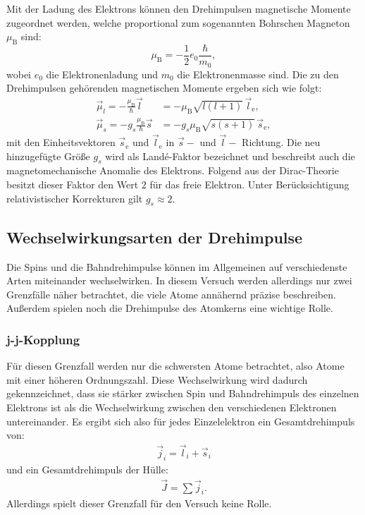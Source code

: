 \documentclass{article}
\begin{document}
	Mit der Ladung des Elektrons können den Drehimpulsen magnetische Momente zugeordnet werden, welche proportional zum sogenannten Bohrschen Magneton $\mu_\text{B}$ sind:
	\begin{equation}
	\mu_{\text{B}} = -\frac{1}{2} e_0 \frac{\hbar}{m_0},
	\end{equation}
	wobei $e_0$ die Elektronenladung und $m_0$ die Elektronenmasse sind. Die zu den Drehimpulsen gehörenden magnetischen Momente ergeben sich wie folgt:
	\begin{align}
	\vec{\mu}_l=-\frac{\mu_\text{B}}{\hbar}\vec{l}&=-\mu_\text{B}\sqrt{l(l+1)}\,\vec{l}_\text{e},\\
	\vec{\mu}_s=-g_s\frac{\mu_\text{B}}{\hbar}\vec{s}&=-g_s\mu_\text{B}\sqrt{s(s+1)}\,\vec{s}_\text{e},
	\end{align}
	mit den Einheitsvektoren $\vec{s}_\text{e}$ und $\vec{l}_\text{e}$ in $\vec{s}-$ und $\vec{l}-$ Richtung. Die neu hinzugefügte Größe $g_s$ wird als Landé-Faktor bezeichnet und beschreibt auch die magnetomechanische Anomalie des Elektrons. Folgend aus der Dirac-Theorie besitzt dieser Faktor den Wert $2$ für das freie Elektron. Unter Berücksichtigung relativistischer Korrekturen gilt $g_s \approx 2$.
	
	\subsection{Wechselwirkungsarten der Drehimpulse}
	\label{sec:Wechselwirkungen}
	Die Spins und die Bahndrehimpulse können im Allgemeinen auf verschiedenste Arten miteinander wechselwirken. In diesem Versuch werden allerdings nur zwei Grenzfälle näher betrachtet, die viele Atome annähernd präzise beschreiben. Außerdem spielen noch die Drehimpulse des Atomkerns eine wichtige Rolle.
	
	\subsubsection{j-j-Kopplung}
	Für diesen Grenzfall werden nur die schwersten Atome betrachtet, also Atome mit einer höheren Ordnungszahl. Diese Wechselwirkung wird dadurch gekennzeichnet, dass sie stärker zwischen Spin und Bahndrehimpuls des einzelnen Elektrons ist als die Wechselwirkung zwischen den verschiedenen Elektronen untereinander. Es ergibt sich also für jedes Einzelelektron ein Gesamtdrehimpuls von:
	\begin{align}
	\vec{j}_i=\vec{l}_i+\vec{s}_i
	\end{align}
	und ein Gesamtdrehimpuls der Hülle:
	\begin{align}
	\vec{J}=\sum\vec{j}_i.
	\end{align}
	Allerdings spielt dieser Grenzfall für den Versuch keine Rolle.
	
\end{document}
